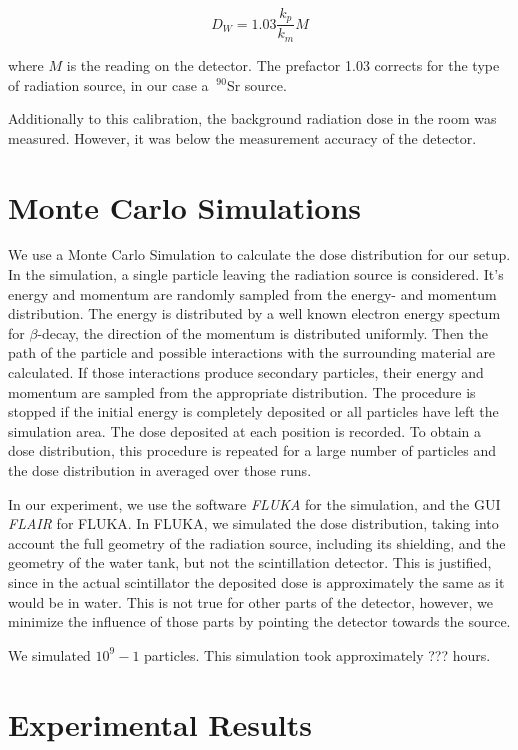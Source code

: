 \documentclass[a4paper,parskip]{scrartcl}
\begin{document}
$$D_W = 1.03\frac{k_p}{k_m}M$$

where $M$ is the reading on the detector. The prefactor 1.03 corrects for the type of radiation source, in our case a $~^{90}$Sr source.

Additionally to this calibration, the background radiation dose in the room was measured. However, it was below the measurement accuracy of the detector.

\section{Monte Carlo Simulations}
We use a Monte Carlo Simulation to calculate the dose distribution for our setup. In the simulation, a single particle leaving the radiation source is considered. It's energy and momentum are randomly sampled from the energy- and momentum distribution. The energy is distributed by a well known electron energy spectum for $\beta$-decay, the direction of the momentum is distributed uniformly. Then the path of the particle and possible interactions with the surrounding material are calculated. If those interactions produce secondary particles, their energy and momentum are sampled from the appropriate distribution. The procedure is stopped if the initial energy is completely deposited or all particles have left the simulation area. The dose deposited at each position is recorded. To obtain a dose distribution, this procedure is repeated for a large number of particles and the dose distribution in averaged over those runs.

In our experiment, we use the software \textit{FLUKA} for the simulation, and the GUI \textit{FLAIR} for FLUKA. In FLUKA, we simulated the dose distribution, taking into account the full geometry of the radiation source, including its shielding, and the geometry of the water tank, but not the scintillation detector. This is justified, since in the actual scintillator the deposited dose is approximately the same as it would be in water. This is not true for other parts of the detector, however, we minimize the influence of those parts by pointing the detector towards the source.

We simulated $10^9-1$ particles. This simulation took approximately {\color{red}???} hours.


\section{Experimental Results}
\end{document}
